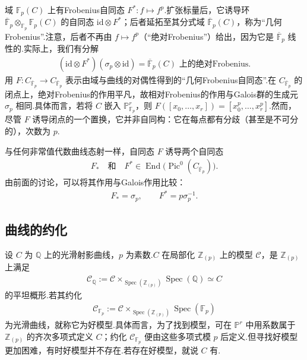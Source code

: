 域 $\mathbb F_p(C)$ 上有Frobenius自同态 $F^*:f\mapsto f^p$.扩张标量后，它诱导环 $\overline{\mathbb F}_p\otimes_{\mathbb F_p}\mathbb F_p(C)$ 的自同态 $\mathrm{id}\otimes F^*$；后者延拓至其分式域 $\overline{\mathbb F}_p(C)$，称为``几何Frobenius''.注意，后者不再由 $f\mapsto f^p$（``绝对Frobenius''）给出，因为它是 $\overline{\mathbb F}_p$ 线性的.实际上，我们有分解
\begin{align*}
(\mathrm{id}\otimes F^*)(\sigma_p\otimes\mathrm{id})=\overline{\mathbb F}_p(C)\text{ 上的绝对Frobenius}.
\end{align*}
用 $F:C_{\overline{\mathbb F}_p}\longrightarrow C_{\overline{\mathbb F}_p}$ 表示由域与曲线的对偶性得到的``几何Frobenius自同态''.在 $C_{\overline{\mathbb F}_p}$ 的闭点上，绝对Frobenius的作用平凡，故相对Frobenius的作用与Galois群的生成元 $\sigma_p$ 相同.具体而言，若将 $C$ 嵌入 $\mathbb P^r_{\mathbb F_p}$，则 $F([x_0,\ldots,x_r])=[x_0^p,\ldots,x_r^p]$.然而，尽管 $F$ 诱导闭点的一个置换，它并非自同构：它在每点都有分歧（甚至是不可分的），次数为 $p$.



与任何非常值代数曲线态射一样，自同态 $F$ 诱导两个自同态
\begin{align*}
F_*\quad\text{和}\quad F^*\in\operatorname{End}\bigl(\operatorname{Pic}^0(C_{\overline{\mathbb F}_p})\bigr).
\end{align*}
由前面的讨论，可以将其作用与Galois作用比较：
\begin{align*}
F_*=\sigma_p,\qquad F^*=p\sigma_p^{-1}.
\end{align*}
\subsection{曲线的约化}\label{sec:modular-2-4-3}

设 $C$ 为 $\mathbb Q$ 上的光滑射影曲线，$p$ 为素数.$C$ 在局部化 $\mathbb Z_{(p)}$ 上的模型 $\mathcal C$，是 $\mathbb Z_{(p)}$ 上满足
\begin{align*}
\mathcal C_{\mathbb Q}:=\mathcal C\times_{\operatorname{Spec}(\mathbb Z_{(p)})}\operatorname{Spec}(\mathbb Q)\simeq C
\end{align*}
的平坦概形.若其约化
\begin{align*}
\mathcal C_{\mathbb F_p}:=\mathcal C\times_{\operatorname{Spec}(\mathbb Z_{(p)})}\operatorname{Spec}(\mathbb F_p)
\end{align*}
为光滑曲线，就称它为好模型.具体而言，为了找到模型，可在 $\mathbb P^r$ 中用系数属于 $\mathbb Z_{(p)}$ 的齐次多项式定义 $C$；约化 $\mathcal C_{\mathbb F_p}$ 便由这些多项式模 $p$ 后定义.但寻找好模型更加困难，有时好模型并不存在.若存在好模型，就说 $C$ 有.




